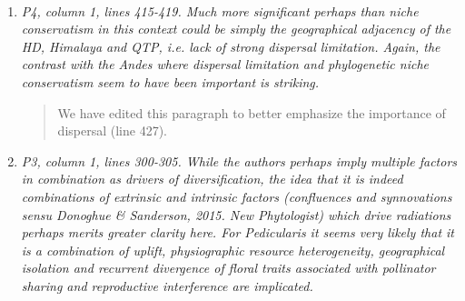 \documentclass[11pt]{letter}
\begin{document}
\begin{letter}{ \\

}
\begin{enumerate}
  \begin{quote}
    We have expanded our discussion of the Cerrado and thank the
    reviewer for these insights.
  \end{quote}

  \textit{First, the idea of "colonization" with its implication of
    some form of geographical dispersal from adjacent areas, may not
    apply in the case of the Cerrado, where more likely Cerrado
    lineages simply adapted from ancestral forest lineages to tolerate
    fire in situ with the expansion of savanna grasslands associated
    with Pliocene formation of the Cerrado, as suggested by Simon et
    al (2009).}

  \begin{quote}
    Thank you for this correction, this is clearly stated in Simon et
    al. We have replaced ``colonization'' with ``in situ adaptation''
    (line 415).
  \end{quote}

  \textit{Furthermore, it is also wrong to suggest that there is
    limited in situ diversification of Cerrado lineages. There are
    several well-documented examples of clades in the Cerrado that
    show accelerated rates of in situ species diversification
    generating clades of up to 50 or more species, especially in the
    higher campos rupestres habitats embedded within the Cerrado
    s.l. (see e.g. Mimosa Koenen et al 2013 S Afr J Bot; Calliandra de
    Souza et al 2014 Taxon 62: 1201-1220; Chamaecrista Rando et al
    2016 Int J Plant Sci 177: 3-17).}

  \begin{quote}
    We have revised the section to include this point and references
    (line 417).
  \end{quote}

\item \textit{P4, column 1, lines 415-419. Much more significant
    perhaps than niche conservatism in this context could be simply
    the geographical adjacency of the HD, Himalaya and QTP, i.e. lack
    of strong dispersal limitation. Again, the contrast with the Andes
    where dispersal limitation and phylogenetic niche conservatism
    seem to have been important is striking.}

  \begin{quote}
    We have edited this paragraph to better emphasize the importance
    of dispersal (line 427).
  \end{quote}

\item \textit{P3, column 1, lines 300-305. While the authors perhaps
    imply multiple factors in combination as drivers of
    diversification, the idea that it is indeed combinations of
    extrinsic and intrinsic factors (confluences and synnovations
    sensu Donoghue \& Sanderson, 2015. New Phytologist) which drive
    radiations perhaps merits greater clarity here. For Pedicularis it
    seems very likely that it is a combination of uplift,
    physiographic resource heterogeneity, geographical isolation and
    recurrent divergence of floral traits associated with pollinator
    sharing and reproductive interference are implicated.}


\end{enumerate}
\end{letter}
\end{document}
